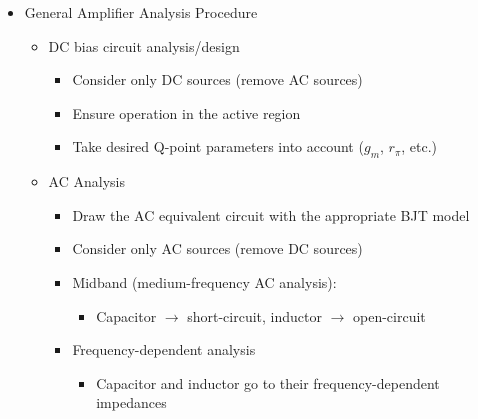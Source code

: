 \begin{itemize}

  \item General Amplifier Analysis Procedure

    \begin{itemize}

      \item DC bias circuit analysis/design

        \begin{itemize}

          \item Consider only DC sources (remove AC sources)

          \item Ensure operation in the active region

          \item Take desired Q-point parameters into account ($g_m$, $r_\pi$, etc.)

        \end{itemize}

      \item AC Analysis

        \begin{itemize}

          \item Draw the AC equivalent circuit with the appropriate BJT model

          \item Consider only AC sources (remove DC sources)

          \item Midband (medium-frequency AC analysis):

              \begin{itemize}

                \item Capacitor $\to$ short-circuit, inductor $\to$ open-circuit

              \end{itemize}

            \item Frequency-dependent analysis

              \begin{itemize}

                \item Capacitor and inductor go to their frequency-dependent impedances

              \end{itemize}


\end{itemize}
\end{itemize}
\end{itemize}
